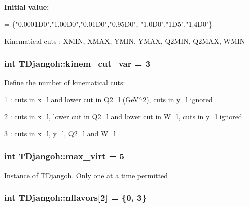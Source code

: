 {\bfseries Initial value\+:}
\begin{DoxyCode}
= \{\textcolor{stringliteral}{"0.0001D0"},\textcolor{stringliteral}{"1.00D0"},\textcolor{stringliteral}{"0.01D0"},\textcolor{stringliteral}{"0.95D0"},
                         \textcolor{stringliteral}{"1.0D0"},\textcolor{stringliteral}{"1D5"},\textcolor{stringliteral}{"1.4D0"}\}
\end{DoxyCode}
Kinematical cuts \+: X\+M\+I\+N, X\+M\+A\+X, Y\+M\+I\+N, Y\+M\+A\+X, Q2\+M\+I\+N, Q2\+M\+A\+X, W\+M\+I\+N \hypertarget{class_t_djangoh_a1e292bba8a06321f62a1548e74e0fb9e}{
\subsubsection[{kinem\+\_\+cut\+\_\+var}]{\setlength{\rightskip}{0pt plus 5cm}int T\+Djangoh\+::kinem\+\_\+cut\+\_\+var = 3}}\label{class_t_djangoh_a1e292bba8a06321f62a1548e74e0fb9e}
Define the number of kinematical cuts\+:
\begin{DoxyItemize}
\item 1 \+: cuts in x\+\_\+l and lower cut in Q2\+\_\+l (Ge\+V$^\wedge$2), cuts in y\+\_\+l ignored
\item 2 \+: cuts in x\+\_\+l, lower cut in Q2\+\_\+l and lower cut in W\+\_\+l, cuts in y\+\_\+l ignored
\item 3 \+: cuts in x\+\_\+l, y\+\_\+l, Q2\+\_\+l and W\+\_\+l 
\end{DoxyItemize}\hypertarget{class_t_djangoh_aaf2a9c700d5ec37607f7241d2b13bd17}{
\subsubsection[{max\+\_\+virt}]{\setlength{\rightskip}{0pt plus 5cm}int T\+Djangoh\+::max\+\_\+virt = 5}}\label{class_t_djangoh_aaf2a9c700d5ec37607f7241d2b13bd17}
Instance of \hyperlink{class_t_djangoh}{T\+Djangoh}. Only one at a time permitted \hypertarget{class_t_djangoh_af4b02bd635a9e893dc83224ce9997b26}{
\subsubsection[{nflavors}]{\setlength{\rightskip}{0pt plus 5cm}int T\+Djangoh\+::nflavors\mbox{[}2\mbox{]} = \{0, 3\}}}\label{class_t_djangoh_af4b02bd635a9e893dc83224ce9997b26}
